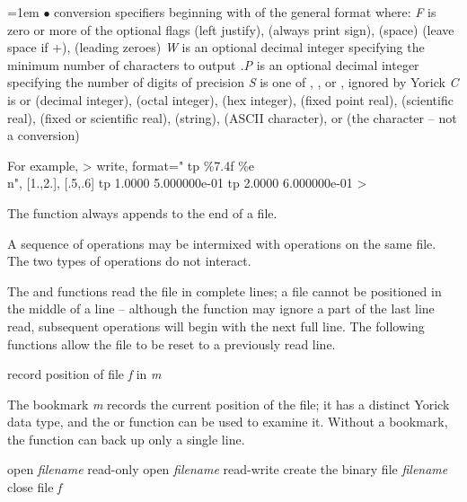 \hangindent=1em
$\bullet$ conversion specifiers beginning with \kbd{\%} \hfil\break
of the general format  where: \hfil\break
{\it F\/} is zero or more of the optional flags \kbd{-} (left justify),
\kbd{+} (always print sign), (space) (leave space if +), 
(leading zeroes) \hfil\break
{\it W\/} is an optional decimal integer specifying the minimum number
of characters to output \hfil\break
{\it .P\/} is an optional decimal integer specifying the number of
digits of precision \hfil\break
{\it S\/} is one of , , or , ignored by Yorick \hfil\break
{\it C\/} is  or  (decimal integer),  (octal integer),
 (hex integer),  (fixed point real),  (scientific
real),  (fixed or scientific real),  (string), 
(ASCII character), or \kbd{\%} (the \kbd{\%} character -- not a conversion)

For example,
\beginexample
> write, format="   tp \%7.4f \%e\\n", [1.,2.], [.5,.6]
   tp  1.0000 5.000000e-01
   tp  2.0000 6.000000e-01
>
\endexample


The  function always appends to the end of a file.

A sequence of  operations may be intermixed with 
operations on the same file.  The two types of operations do not
interact.

The  and  functions read the file in complete
lines; a file cannot be positioned in the middle of a line -- although
the  function may ignore a part of the last line read,
subsequent  operations will begin with the next full line.
The following functions allow the file to be reset to a previously
read line.

     {record position of file {\it f\/} in {\it m}}

The bookmark {\it m\/} records the current position of the file; it
has a distinct Yorick data type, and the  or 
function can be used to examine it.  Without a bookmark, the 
function can back up only a single line.


     {open {\it filename\/} read-only}
     {open {\it filename\/} read-write}
     {create the binary file {\it filename\/}}
     {close file {\it f}}

